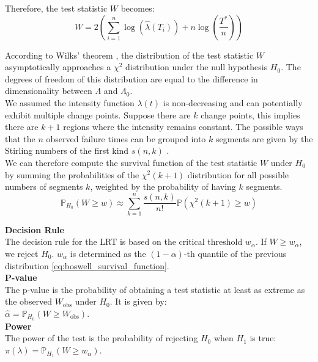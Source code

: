 \documentclass{journalstyle}
\begin{document}
Therefore, the test statistic $W$ becomes:
\begin{equation}
    W = 2 \left( \sum_{i=1}^{n} \log(\hat{\lambda}(T_i)) + n \log\left(\frac{T^*}{n}\right) \right)
    \label{eq:boswell_test_statistic}
\end{equation}

According to Wilks' theorem \cite{Wilks1938}, the distribution of the test statistic $W$ asymptotically approaches a $\chi^2$ distribution under the null hypothesis $H_0$.
The degrees of freedom of this distribution are equal to the difference in dimensionality between $\Lambda$ and $\Lambda_0$. \\

We assumed the intensity function $\lambda(t)$ is non-decreasing and can potentially exhibit multiple change points.
Suppose there are $k$ change points, this implies there are $k + 1$ regions where the intensity remains constant.
The possible ways that the $n$ observed failure times can be grouped into $k$ segments are given by the Stirling numbers of the first kind $s(n, k)$ \cite{StirlingNumbers}. \\
We can therefore compute the survival function of the test statistic $W$ under $H_0$ by summing the probabilities of the $\chi^2(k+1)$ distribution for all possible numbers of segments $k$, weighted by the probability of having $k$ segments.
\begin{equation}
    \mathbb{P}_{H_0}(W \geq w) \approx \sum_{k=1}^{n} \frac{s(n, k)}{n!} \mathbb{P}(\chi^2(k+1) \geq w)
    \label{eq:boswell_survival_function}
\end{equation}


\noindent\textbf{Decision Rule} \\
The decision rule for the LRT is based on the critical threshold $w_{\alpha}$. 
If $W \geq w_{\alpha}$, we reject $H_0$. $w_{\alpha}$ is determined as the $(1 - \alpha)$-th quantile of the previous distribution \eqref{eq:boswell_survival_function}. \\

\noindent\textbf{P-value} \\
The p-value is the probability of obtaining a test statistic at least as extreme as the observed $W_{\text{obs}}$ under $H_0$. 
It is given by: \\
$\hat{\alpha} = \mathbb{P}_{H_0}(W \geq W_{\text{obs}})$. \\

\noindent\textbf{Power} \\
The power of the test is the probability of rejecting $H_0$ when $H_1$ is true: \\
$\pi(\lambda) = \mathbb{P}_{H_1}(W \geq w_{\alpha})$. \\
\end{document}
